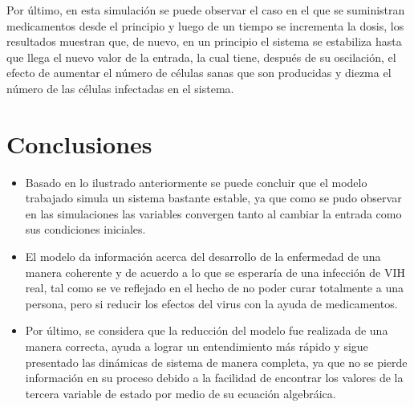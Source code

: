 \documentclass{article}
\begin{document}
Por último, en esta simulación se puede observar el caso en el que se
suministran medicamentos desde el principio y luego de un tiempo se incrementa
la dosis, los resultados muestran que, de nuevo, en un principio el sistema se
estabiliza hasta que llega el nuevo valor de la entrada, la cual 
tiene, después de su oscilación, el efecto de aumentar el número de
células sanas que son producidas y diezma el número de las células infectadas
en el sistema.

\section{Conclusiones}

\begin{itemize}
    \item Basado en lo ilustrado anteriormente se puede concluir que el modelo
    trabajado simula un sistema bastante estable, ya que como se pudo observar en
    las simulaciones las variables convergen tanto al cambiar la entrada como
    sus condiciones iniciales.

    \item El modelo da información acerca del desarrollo de la enfermedad
    de una manera coherente y de acuerdo a lo que se esperaría de una infección
    de VIH real, tal como se ve reflejado en el hecho de no poder curar totalmente
    a una persona, pero si reducir los efectos del virus con la ayuda de medicamentos.

    \item Por último, se considera que la reducción del modelo fue realizada de
    una manera correcta, ayuda a lograr un entendimiento más rápido y sigue
    presentado las dinámicas de sistema de manera completa, ya que no se pierde
    información en su proceso debido a la facilidad de encontrar los valores de
    la tercera variable de estado por medio de su ecuación algebráica.
\end{itemize}



\end{document}
